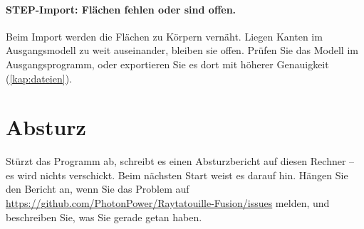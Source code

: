 \paragraph{STEP-Import: Flächen fehlen oder sind offen.}
Beim Import werden die Flächen zu Körpern vernäht. Liegen Kanten im Ausgangsmodell zu weit
auseinander, bleiben sie offen. Prüfen Sie das Modell im Ausgangsprogramm, oder exportieren Sie
es dort mit höherer Genauigkeit (\autoref{kap:dateien}).

\section{Absturz}

Stürzt das Programm ab, schreibt es einen Absturzbericht auf diesen Rechner -- es wird nichts
verschickt. Beim nächsten Start weist es darauf hin. Hängen Sie den Bericht an, wenn Sie das
Problem auf
\url{https://github.com/PhotonPower/Raytatouille-Fusion/issues} melden, und beschreiben Sie,
was Sie gerade getan haben.
